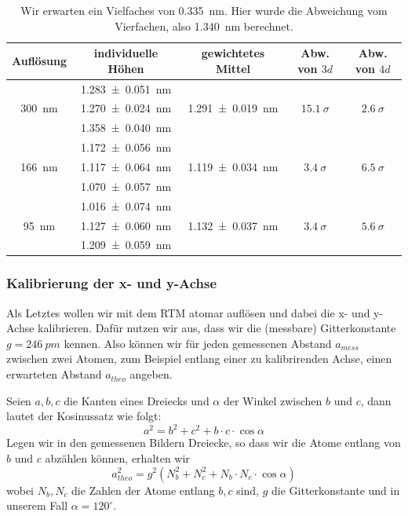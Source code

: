 \begin{table}[H]
	\renewcommand{\arraystretch}{1.5}
	\centering
	\begin{tabular}{|c|c|c|c|c|}
		\hline
		Auflösung & individuelle Höhen & gewichtetes Mittel & Abw. von $3d$ & Abw. von $4d$\\
		\hline
		\multirow{3}{*}{\SI{300}{nm}} & \SI{1.283+-0.051}{nm} & \multirow{3}{*}{\SI{1.291+-0.019}{nm}} & \multirow{3}{*}{$\SI{15,1}{\sigma}$} & \multirow{3}{*}{$\SI{2,6}{\sigma}$} \\
		 & \SI{1.270+-0.024}{nm} & & & \\
		 & \SI{1.358+-0.040}{nm} & & & \\
		\hline
		\multirow{3}{*}{\SI{166}{nm}} & \SI{1.172+-0.056}{nm} & \multirow{3}{*}{\SI{1,119+-0,034}{nm}} & \multirow{3}{*}{$\SI{3,4}{\sigma}$} & \multirow{3}{*}{$\SI{6,5}{\sigma}$} \\
		 & \SI{1.117+-0.064}{nm} & & & \\
		 & \SI{1.070+-0.057}{nm} & & & \\
		\hline
		\multirow{3}{*}{\SI{95}{nm}} & \SI{1.016+-0.074}{nm} & \multirow{3}{*}{\SI{1,132+-0,037}{nm}} & \multirow{3}{*}{$\SI{3,4}{\sigma}$} & \multirow{3}{*}{$\SI{5,6}{\sigma}$} \\
		 & \SI{1.127+-0.060}{nm} & & & \\
		 & \SI{1.209+-0.059}{nm} & & & \\
		\hline
	\end{tabular}
	\caption{Wir erwarten ein Vielfaches von \SI{0,335}{nm}. Hier wurde die Abweichung vom Vierfachen, also \SI{1,340}{nm} berechnet.}
	\label{tab:heights}
\end{table}

\subsubsection{Kalibrierung der x- und y-Achse}

Als Letztes wollen wir mit dem RTM atomar auflösen und dabei die x- und y-Achse kalibrieren. Dafür nutzen wir aus, dass wir die (messbare) Gitterkonstante $g = \SI{246}{pm}$ kennen. Also können wir für jeden gemessenen Abstand $a_{mess}$ zwischen zwei Atomen, zum Beispiel entlang einer zu kalibrirenden Achse, einen erwarteten Abstand $a_{theo}$ angeben.

Seien $a, b, c$ die Kanten eines Dreiecks und $\alpha$ der Winkel zwischen $b$ und $c$, dann lautet der Kosinussatz wie folgt:
\begin{equation}
a^2 = b^2 + c^2 + b \cdot c \cdot \cos\alpha
\end{equation}
Legen wir in den gemessenen Bildern Dreiecke, so dass wir die Atome entlang von $b$ und $c$ abzählen können, erhalten wir
\begin{equation}
a_{theo}^2 = g^2 (N_b^2 + N_c^2 + N_b \cdot N_c \cdot \cos\alpha)
\end{equation}
wobei $N_b, N_c$ die Zahlen der Atome entlang $b, c$ sind, $g$ die Gitterkonstante und in unserem Fall $\alpha = 120^{\circ}$.


